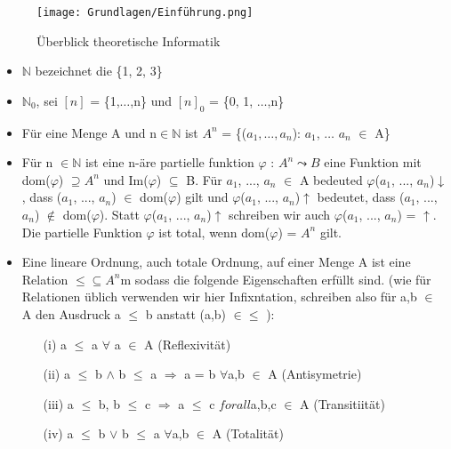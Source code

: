 \begin{figure}
    \centering
    \texttt{[image: Grundlagen/Einführung.png]}
    \caption{Überblick theoretische Informatik}
    \label{fig:example}
\end{figure}


\begin{itemize}
    \item $\mathbb{N}$ bezeichnet die \{1, 2, 3\}
    \item $\mathbb{N}_{0}$, sei $[n]$ = \{1,$\ldots $,n\} und $[n]_{0}$ = \{0, 1, $\ldots $,n\} 
    \item Für eine Menge A und n$\in \mathbb{N}$ ist $A^{n}$ = \{($a_{1},\ldots, a_{n}$): $a_{1}$, $\ldots$ $a_{n}$ $\in$ A\}
    \item Für n $\in \mathbb{N}$ ist eine n-äre partielle funktion $\varphi$ : $A^{n} \leadsto B $ eine Funktion mit dom($\varphi$) $\supseteq A^{n}$ und Im($\varphi$) $\subseteq$ B. 
    Für $a_{1}$, ..., $a_{n}$ $\in$ A bedeuted $\varphi$($a_{1}$, ..., $a_{n}$)$\downarrow$, dass ($a_{1}$, ..., $a_{n}$) $\in$ dom($\varphi$) gilt und $\varphi$($a_{1}$, ..., $a_{n}$)$\uparrow$ bedeutet, 
    dass ($a_{1}$, ..., $a_{n}$) $\notin$ dom($\varphi$). Statt $\varphi$($a_{1}$, ..., $a_{n}$)$\uparrow$ schreiben wir auch $\varphi$($a_{1}$, ..., $a_{n}$) = $\uparrow$.
    Die partielle Funktion $\varphi$ ist total, wenn dom($\varphi$) = $A^{n}$ gilt.
    \item Eine lineare Ordnung, auch totale Ordnung, auf einer Menge A ist eine Relation $\leq  \subseteq  A^{n}$m sodass die folgende Eigenschaften erfüllt sind. 
    (wie für Relationen üblich verwenden wir hier Infixntation, schreiben also für a,b $\in$ A den Ausdruck a $\leq $ b anstatt (a,b) $\in \leq $ ): 
    \begin{enumerate}
        \item[(i)] a $\leq $ a $\forall$ a $\in$ A (Reflexivität)
        \item[(ii)] a $\leq $ b $ \land $ b $\leq $ a $\Rightarrow $ a = b $\forall$a,b $\in$ A (Antisymetrie)
        \item[(iii)] a $\leq $ b, b $\leq $ c $\Rightarrow$ a $\leq $ c $forall$a,b,c $\in$ A (Transitiität)
        \item[(iv)] a $\leq $ b $\vee$ b $\leq $ a $\forall$a,b $\in$ A (Totalität)
    \end{enumerate} 
\end{itemize}

